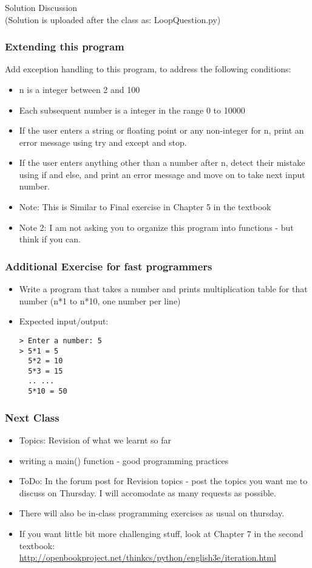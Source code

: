 \documentclass{beamer}
\begin{document}
\begin{frame}
\frametitle{}
\centering Solution Discussion
\\ \tiny (Solution is uploaded after the class as: LoopQuestion.py)
\end{frame}

\begin{frame}
\frametitle{Extending this program}
Add exception handling to this program, to address the following conditions:
\begin{itemize}
\item n is a integer between 2 and 100
\item Each subsequent number is a integer in the range 0 to 10000
\item If the user enters a string or floating point or any non-integer for n, print an error message using try and except and stop.
\item If the user enters anything other than a number after n, detect their mistake using if and else, and print an error message and move on to take next input number.
\item Note: This is Similar to Final exercise in Chapter 5 in the textbook
\item Note 2: I am not asking you to organize this program into functions - but think if you can. 
\end{itemize}
\end{frame}

\begin{frame}[fragile]
\frametitle{Additional Exercise for fast programmers}
\begin{itemize}
\item Write a program that takes a number and prints multiplication table for that number (n*1 to n*10, one number per line)
\item Expected input/output:
\begin{verbatim}
> Enter a number: 5
> 5*1 = 5
  5*2 = 10
  5*3 = 15
  .. ... 
  5*10 = 50
\end{verbatim}
\end{itemize}

\end{frame}

\begin{frame}
\frametitle{Next Class}
\begin{itemize}
\item Topics: Revision of what we learnt so far
\item writing a main() function - good programming practices
\item ToDo: In the forum post for Revision topics - post the topics you want me to discuss on Thursday. I will accomodate as many requests as possible. 
\item There will also be in-class programming exercises as usual on thursday. 
\item If you want little bit more challenging stuff, look at Chapter 7 in the second textbook: \url{http://openbookproject.net/thinkcs/python/english3e/iteration.html}
\end{itemize}
\end{frame}
\end{document}
